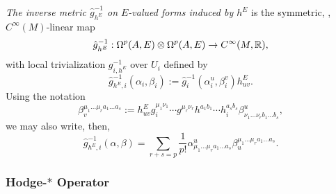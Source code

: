\begin{definition}
\emph{The inverse metric $\hat g_{h^E}^{-1}$ on $E$-valued forms induced by $h^E$} is the symmetric, , $C^\infty(M)$-linear map
\begin{equation}
    \hat g^{-1}_{h^E}: \Omega^p(A, E) \otimes \Omega^p(A, E) \to C^\infty(M, \mathbb{R}),
\end{equation}
with local trivialization $g^{-1}_{i, h^E}$ over $U_i$ defined by
\begin{equation}
    \hat g_{h^E, i}^{-1}(\alpha_i, \beta_i) := \hat g_{i}^{-1}(\alpha_i^u, \beta_i^v) h^E_{uv}.
\end{equation}
Using the notation
\begin{equation}\label{equationNotationRaisingIndicesWithAlgebra}
    \beta_v^{\mu_1 \dots \mu_r a_1 \dots a_s} := h^E_{uv} g_i^{\mu_1 \nu_1} \cdots g^{\mu_r \nu_r} h^{a_1 b_1} \cdots h_i^{a_s b_s} \beta^u_{\nu_1 \dots \nu_r b_1 \dots  b_s},
\end{equation}
we may also write, then,
\begin{equation}
    \hat g_{h^E, i}^{-1}(\alpha, \beta) = \sum_{r+s = p} \frac{1}{p!} \alpha^u_{\mu_1 \dots \mu_r a_1 \dots a_s} \beta_u^{\mu_1 \dots \mu_r a_1 \dots  a_s}.
\end{equation}
\end{definition}

\subsubsection{Hodge-$*$ Operator}

